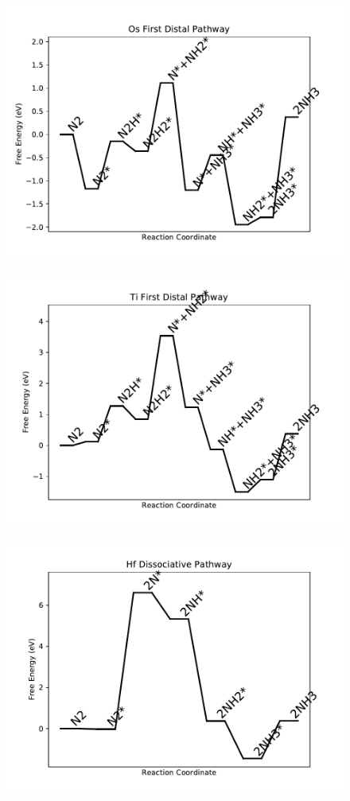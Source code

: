 \begin{figure}
\centering
\includegraphics[width=0.8\linewidth]{data/plots/Os_distal_1.pdf}
\end{figure}

\begin{figure}
\centering
\includegraphics[width=0.8\linewidth]{data/plots/Ti_distal_1.pdf}
\end{figure}

\begin{figure}
\centering
\includegraphics[width=0.8\linewidth]{data/plots/Hf_dissociative.pdf}
\end{figure}

